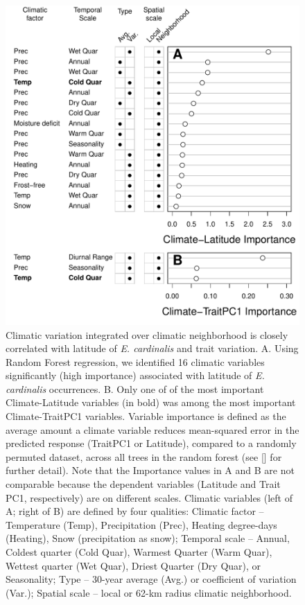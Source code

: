 \documentclass[11pt, oneside]{article}
\begin{document}

\begin{figure}[h!]
	\centerline{\includegraphics[width=1\textwidth]{Figures/Figure_ClimVarImp.pdf}}
	\fontsize{10}{12}
	\selectfont
	\caption[Climatic variation integrated over climatic neighborhood is closely correlated with latitude of \textit{E. cardinalis} and trait variation]{Climatic variation integrated over climatic neighborhood is closely correlated with latitude of \textit{E. cardinalis} and trait variation.  A. Using Random Forest regression, we identified 16 climatic variables significantly (high importance) associated with latitude of \textit{E. cardinalis} occurrences. B. Only one of of the most important Climate-Latitude variables (in bold) was among the most important Climate-TraitPC1 variables. Variable importance is defined as the average amount a climate variable reduces mean-squared error in the predicted response (TraitPC1 or Latitude), compared to a randomly permuted dataset, across all trees in the random forest (see \citeauthor{Genuer_etal_2015} [\citeyear{Genuer_etal_2015}] for further detail). Note that the Importance values in A and B are not comparable because the dependent variables (Latitude and Trait PC1, respectively) are on different scales. Climatic variables (left of A; right of B) are defined by four qualities: Climatic factor -- Temperature (Temp), Precipitation (Prec), Heating degree-days (Heating), Snow (precipitation as snow); Temporal scale -- Annual, Coldest quarter (Cold Quar), Warmest Quarter (Warm Quar), Wettest quarter (Wet Quar), Driest Quarter (Dry Quar), or Seasonality; Type -- 30-year average (Avg.) or coefficient of variation (Var.); Spatial scale -- local or 62-km radius climatic neighborhood.}

\end{figure}
\end{document}
